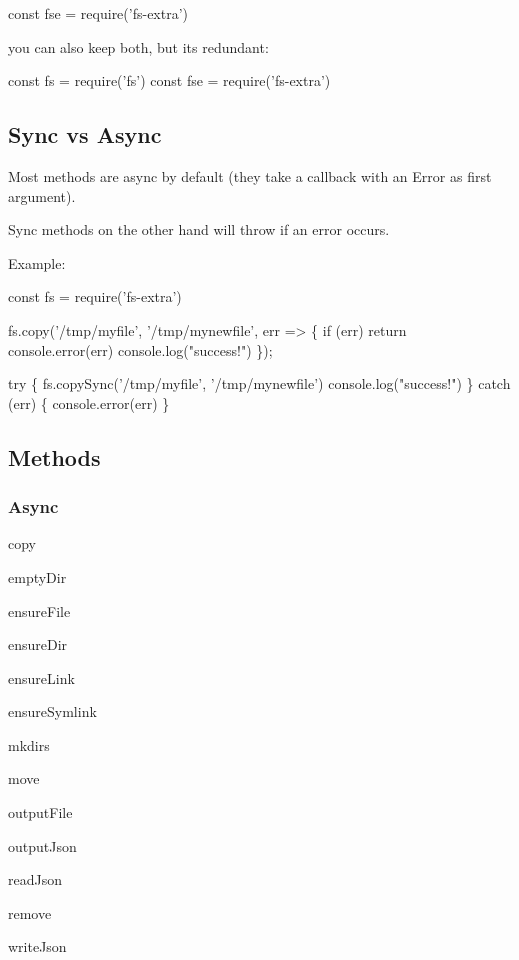 \begin{DoxyCode}
const fse = require('fs-extra')
\end{DoxyCode}


you can also keep both, but it\textquotesingle{}s redundant\+:


\begin{DoxyCode}
const fs = require('fs')
const fse = require('fs-extra')
\end{DoxyCode}


\subsection*{Sync vs Async }

Most methods are async by default (they take a callback with an {\ttfamily Error} as first argument).

Sync methods on the other hand will throw if an error occurs.

Example\+:


\begin{DoxyCode}
const fs = require('fs-extra')

fs.copy('/tmp/myfile', '/tmp/mynewfile', err => \{
  if (err) return console.error(err)
  console.log("success!")
\});

try \{
  fs.copySync('/tmp/myfile', '/tmp/mynewfile')
  console.log("success!")
\} catch (err) \{
  console.error(err)
\}
\end{DoxyCode}


\subsection*{Methods }

\subsubsection*{Async}


\begin{DoxyItemize}
\item copy
\item empty\+Dir
\item ensure\+File
\item ensure\+Dir
\item ensure\+Link
\item ensure\+Symlink
\item mkdirs
\item move
\item output\+File
\item output\+Json
\item read\+Json
\item remove
\item write\+Json
\end{DoxyItemize}

